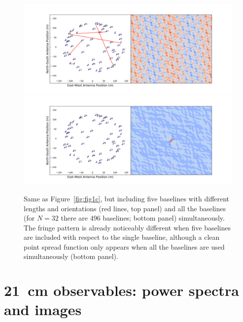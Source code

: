 \begin{figure}[]
\begin{center}
\includegraphics[width=1.\textwidth]{Bernardi/fringe_5bls}
\includegraphics[width=1.\textwidth]{Bernardi/fringe_all}
\end{center}
\caption{Same as Figure~\ref{fig:fig1c}, but including five baselines with different lengths and orientations (red lines, top panel) and all the baselines (for $N = 32$ there are 496 baselines; bottom panel) simultaneously. The fringe pattern is already noticeably different when five baselines are included with respect to the single baseline, although a clean point spread function only appears when all the baselines are used simultaneously (bottom panel).}
\label{fig:fig1d}
\end{figure}





\section{21~cm observables: power spectra and images}
\label{sec:observables}

